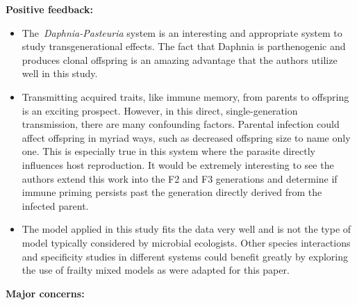 \documentclass[10pt]{article}
\providecommand{\tightlist}{\setlength{\itemsep}{0pt}\setlength{\parskip}{0pt}}%
\begin{document}
\textbf{Positive feedback:}

\begin{itemize}
\tightlist
\item
  The~\emph{Daphnia-Pasteuria} system is an interesting and appropriate
  system to study transgenerational effects. The fact that Daphnia is
  parthenogenic and produces clonal offspring is an amazing advantage
  that the authors utilize well in this study.~
\item
  Transmitting acquired traits, like immune memory, from parents to
  offspring is an exciting prospect. However, in this direct,
  single-generation transmission, there are many confounding factors.
  Parental infection could affect offspring in myriad ways, such as
  decreased offspring size to name only one. This is especially true in
  this system where the parasite directly influences host reproduction.
  It would be extremely interesting to see the authors extend this work
  into the F2 and F3 generations and determine if immune priming
  persists past the generation directly derived from the infected
  parent.~
\item
  The model applied in this study fits the data very well and is not the
  type of model typically considered by microbial ecologists. Other
  species interactions and specificity studies in different systems
  could benefit greatly by exploring the use of frailty mixed models as
  were adapted for this paper.~~
\end{itemize}

\textbf{Major concerns:}
\end{document}
